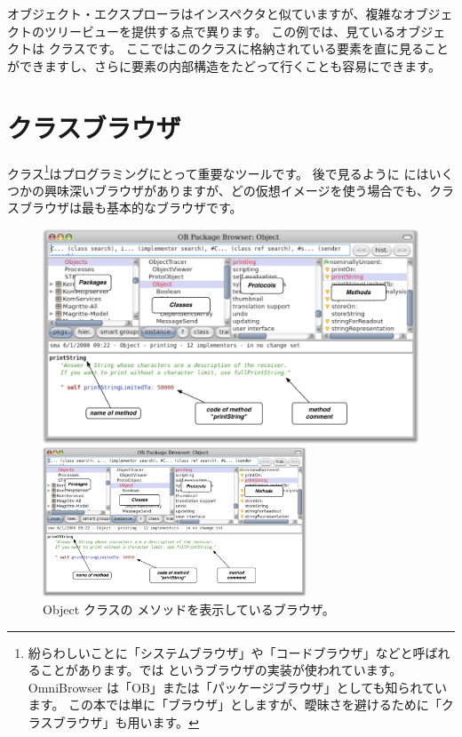 \documentclass[a4paper,10pt,twoside]{book}
\begin{document}
オブジェクト・エクスプローラはインスペクタと似ていますが、複雑なオブジェクトのツリービューを提供する点で異ります。
この例では、見ているオブジェクトは  クラスです。
ここではこのクラスに格納されている要素を直に見ることができますし、さらに要素の内部構造をたどって行くことも容易にできます。

\section{クラスブラウザ}

クラス\footnote{紛らわしいことに「システムブラウザ」や「コードブラウザ」などと呼ばれることがあります。\pharo では  というブラウザの実装が使われています。OmniBrowser は「OB」または「パッケージブラウザ」としても知られています。
この本では単に「ブラウザ」としますが、曖昧さを避けるために「クラスブラウザ」も用います。}はプログラミングにとって重要なツールです。
後で見るように \pharo にはいくつかの興味深いブラウザがありますが、どの仮想イメージを使う場合でも、クラスブラウザは最も基本的なブラウザです。


\begin{figure}[htb]
\ifluluelse
	{\centerline {\includegraphics[width=\textwidth]{ClassBrowser1}}}
	{\centerline {\includegraphics[width=0.7\textwidth]{ClassBrowser1}}}
\caption{Object クラスの  メソッドを表示しているブラウザ。
}
\end{figure}
\end{document}
